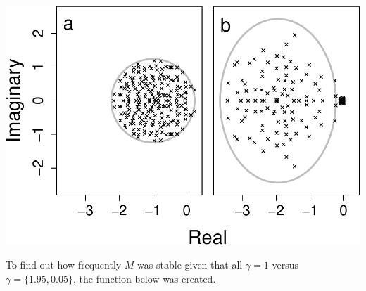 \documentclass[]{article}
\begin{document}
\includegraphics{SI_science_files/figure-latex/unnamed-chunk-6-1.pdf}

To find out how frequently \(M\) was stable given that all
\(\gamma = 1\) versus \(\gamma = \{1.95, 0.05\}\), the function below
was created.
\end{document}
